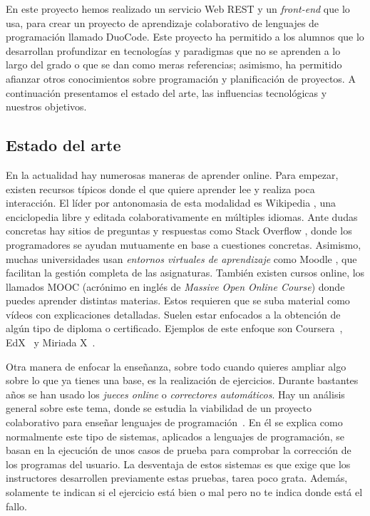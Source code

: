 
En este proyecto hemos realizado un servicio Web REST y un \emph{front-end} que lo usa, para crear un proyecto de aprendizaje colaborativo de lenguajes de programación llamado DuoCode. Este proyecto ha permitido a los alumnos que lo desarrollan profundizar en tecnologías y paradigmas que no se aprenden a lo largo del grado o que se dan como meras referencias; asimismo, ha
permitido afianzar otros conocimientos sobre programación y planificación de proyectos.
A continuación presentamos el estado del arte, las influencias tecnológicas y nuestros objetivos.

\subsection{Estado del arte\label{subsec:estado_arte}}

En la actualidad hay numerosas maneras de aprender online. Para empezar, existen recursos típicos donde el que quiere aprender lee y realiza poca interacción. El líder por antonomasia de esta modalidad es Wikipedia \cite{wiki}, una enciclopedia libre y editada colaborativamente en múltiples idiomas. Ante dudas concretas hay sitios de preguntas y respuestas como Stack Overflow \cite{stack}, donde los programadores se ayudan mutuamente en base a cuestiones concretas. Asimismo, muchas universidades usan \emph{entornos virtuales de aprendizaje} como Moodle \cite{moodle}, que facilitan la gestión completa de las asignaturas. También existen cursos online, los llamados MOOC (acrónimo en inglés de \emph{Massive Open Online Course}) donde puedes aprender distintas materias. Estos requieren  que se suba material como vídeos con explicaciones detalladas. Suelen estar enfocados a la obtención de algún tipo de diploma o certificado. Ejemplos de este enfoque son Coursera~\cite{coursera}, EdX~\cite{edX} y Miriada X~\cite{miriadaX}.

Otra manera de enfocar la enseñanza, sobre todo cuando quieres ampliar algo sobre lo que ya tienes una base, es la realización de ejercicios. Durante bastantes años se han usado los \emph{jueces online} o \emph{correctores automáticos}. Hay un análisis general sobre este tema, donde se estudia la viabilidad de un proyecto colaborativo para enseñar lenguajes de programación~\cite{pimcdDuoCode14}. En él se explica como normalmente este tipo de sistemas, aplicados a lenguajes de programación, se basan en la ejecución de unos casos de prueba para comprobar la corrección de los programas del usuario. La desventaja de estos sistemas es que exige que los instructores desarrollen previamente estas pruebas, tarea poco grata. Además, solamente te indican si el ejercicio está bien o mal pero no te indica donde está el fallo.


